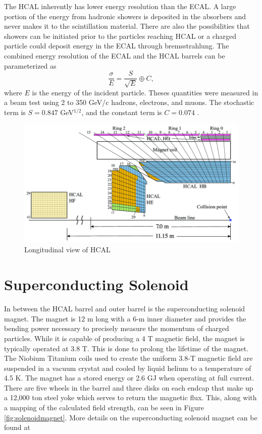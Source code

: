 The HCAL inherently has lower energy resolution than the ECAL.  A large portion of the energy from hadronic showers is deposited in the absorbers and never makes it to the scintillation material.  There are also the possibilities that showers can be initiated prior to the particles reaching HCAL or a charged particle could deposit energy in the ECAL through bremsstrahlung.  The combined energy resolution of the ECAL and the HCAL barrels can be parameterized as
\begin{equation}
\frac{\sigma}{E} = \frac{S}{\sqrt{E}} \oplus C,	
\end{equation}
where $E$ is the energy of the incident particle.  Theses quantities were measured in a beam test using 2 to 350 GeV/c hadrons, electrons, and muons.  The stochastic term is $S=0.847$ GeV$^{1/2}$, and the constant term is $C=0.074$ \cite{Abdullin:2009zz}.


\begin{figure}[h]
	\centering
	\includegraphics[width=1.0\linewidth]{Figures/hcal_longitudinal}
	\caption{Longitudinal view of HCAL \cite{CERN-LHCC-97-031}}
	\label{fig:hcallongitudinal}
\end{figure}

\section{Superconducting Solenoid}
In between the HCAL barrel and outer barrel is the superconducting solenoid magnet.  The magnet is 12 m long with a 6-m inner diameter and provides the bending power necessary to precisely measure the momentum of charged particles.  While it is capable of producing a 4 T magnetic field, the magnet is typically operated at 3.8 T.  This is done to prolong the lifetime of the magnet.  The Niobium Titanium coils used to create the uniform 3.8-T magnetic field are suspended in a vacuum crystat and cooled by liquid helium to a temperature of 4.5 K.  The magnet has a stored energy or 2.6 GJ when operating at full current.  There are five wheels in the barrel and three disks on each endcap that make up a 12,000 ton steel yoke which serves to return the magnetic flux.  This, along with a mapping of the calculated field strength, can be seen in Figure \ref{fig:solenoidmagnet}.  More details on the superconducting solenoid magnet can be found at \cite{CERN-LHCC-97-033}

